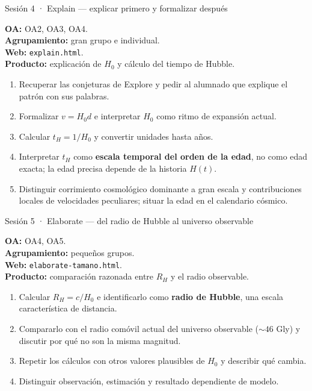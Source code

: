 \begin{guiaficha}{Sesión 4 · Explain --- explicar primero y formalizar después}
\begin{guiameta}
\textbf{OA:} OA2, OA3, OA4.\\
\textbf{Agrupamiento:} gran grupo e individual.\\
\textbf{Web:} \texttt{explain.html}.\\
\textbf{Producto:} explicación de $H_0$ y cálculo del tiempo de Hubble.
\end{guiameta}
\begin{enumerate}[leftmargin=*,itemsep=2pt]
\item {} Recuperar las conjeturas de Explore y pedir al alumnado que explique el patrón con sus palabras.
\item {} Formalizar $v=H_0d$ e interpretar $H_0$ como ritmo de expansión actual.
\item {} Calcular $t_H=1/H_0$ y convertir unidades hasta años.
\item {} Interpretar $t_H$ como \textbf{escala temporal del orden de la edad}, no como edad exacta; la edad precisa depende de la historia $H(t)$.
\item {} Distinguir corrimiento cosmológico dominante a gran escala y contribuciones locales de velocidades peculiares; situar la edad en el calendario cósmico.
\end{enumerate}
\end{guiaficha}

\begin{guiaficha}{Sesión 5 · Elaborate --- del radio de Hubble al universo observable}
\begin{guiameta}
\textbf{OA:} OA4, OA5.\\
\textbf{Agrupamiento:} pequeños grupos.\\
\textbf{Web:} \texttt{elaborate-tamano.html}.\\
\textbf{Producto:} comparación razonada entre $R_H$ y el radio observable.
\end{guiameta}
\begin{enumerate}[leftmargin=*,itemsep=2pt]
\item {} Calcular $R_H=c/H_0$ e identificarlo como \textbf{radio de Hubble}, una escala característica de distancia.
\item {} Compararlo con el radio comóvil actual del universo observable ($\sim46$ Gly) y discutir por qué no son la misma magnitud.
\item {} Repetir los cálculos con otros valores plausibles de $H_0$ y describir qué cambia.
\item {} Distinguir observación, estimación y resultado dependiente de modelo.
\end{enumerate}
\end{guiaficha}

